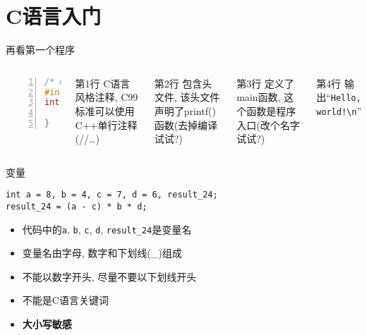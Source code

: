 \section{C语言入门}

\begin{frame}[fragile]{再看第一个程序}
\begin{columns}[T,onlytextwidth]
\emptyline
\emptyline
\emptyline
\small\begin{lstlisting}[language=c,numbers=left]
/* my first program in C */
#include <stdio.h>
int main() {
    printf("Hello, world!\n");
}
\end{lstlisting}

\begin{block}{第1行}
C语言风格注释, C99标准可以使用C++单行注释(//\ldots)
\end{block}
\begin{block}{第2行}
包含头文件, 该头文件声明了printf()函数(去掉编译试试?)
\end{block}
\begin{block}{第3行}
定义了main函数, 这个函数是程序入口(改个名字试试?)
\end{block}
\begin{block}{第4行}
输出\textquotedblleft \texttt{Hello, world!\textbackslash n}\textquotedblright
\end{block}
\end{columns}
\end{frame}

\begin{frame}[fragile]{变量}
\begin{verbatim}
int a = 8, b = 4, c = 7, d = 6, result_24;
result_24 = (a - c) * b * d;
\end{verbatim}
\begin{itemize}[<+- | alert@+>]
\item 代码中的\texttt{a}, \texttt{b}, \texttt{c}, \texttt{d}, \texttt{result\_24}是变量名
\item 变量名由字母, 数字和下划线(\_)组成
\item 不能以数字开头, 尽量不要以下划线开头
\item 不能是C语言关键词
\item \textbf{大小写敏感}
\end{itemize}
\end{frame}

